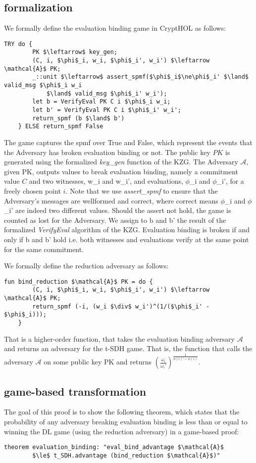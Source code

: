 \subsection{formalization}
We formally define the evaluation binding game in CryptHOL as follows:
\begin{lstlisting}[language=isabelle]
    TRY do {
        PK $\leftarrow$ key_gen;
        (C, i, $\phi$_i, w_i, $\phi$_i', w_i') $\leftarrow \mathcal{A}$ PK;
        _::unit $\leftarrow$ assert_spmf($\phi$_i$\ne\phi$_i' $\land$ valid_msg $\phi$_i w_i 
            $\land$ valid_msg $\phi$_i' w_i');
        let b = VerifyEval PK C i $\phi$_i w_i;
        let b' = VerifyEval PK C i $\phi$_i' w_i';
        return_spmf (b $\land$ b')
    } ELSE return_spmf False
\end{lstlisting}
The game captures the spmf over True and False, which represent the events that the Adversary has broken evaluation binding or not.
The public key $PK$ is generated using the formalized \textit{key\_gen} function of the KZG. The Adversary $\mathcal{A}$, given PK, outputs values to break evaluation binding, namely a commitment value $C$ and two witnesses, w\_i and w\_i', and evaluations, $\phi$\_i and $\phi$\_i',  for a freely chosen point $i$. 
Note that we use \textit{assert\_spmf} to ensure that the Adversary's messages are wellformed and correct, where correct means $\phi$\_i and $\phi$\_i' are indeed two different values. Should the assert not hold, the game is counted as lost for the Adversary.
We assign to b and b' the result of the formalized \textit{VerifyEval} algorithm of the KZG. Evaluation binding is broken if and only if b and b' hold i.e. both witnesses and evaluations verify at the same point for the same commitment.

We formally define the reduction adversary as follows:
\begin{lstlisting}[language=isabelle]
    fun bind_reduction $\mathcal{A}$ PK = do {
        (C, i, $\phi$_i, w_i, $\phi$_i', w_i') $\leftarrow \mathcal{A}$ PK;
        return_spmf (-i, (w_i $\div$ w_i')^(1/($\phi$_i' - $\phi$_i)));
    }
\end{lstlisting}
That is a higher-order function, that takes the evaluation binding adversary $\mathcal{A}$ and returns an adversary for the t-SDH game.
That is, the function that calls the adversary $\mathcal{A}$ on some public key PK and returns $(\frac{\omega_i}{\omega_i'})^{\frac{1}{\phi(i)'-\phi(i)}}$. 

\subsection{game-based transformation}
The goal of this proof is to show the following theorem, which states that the probability of any adversary breaking evaluation binding is less than or equal to winning the DL game (using the reduction adversary) in a game-based proof:
\begin{lstlisting}[language=isabelle]
    theorem evaluation_binding: "eval_bind_advantage $\mathcal{A}$ 
        $\le$ t_SDH.advantage (bind_reduction $\mathcal{A}$)"
\end{lstlisting}

